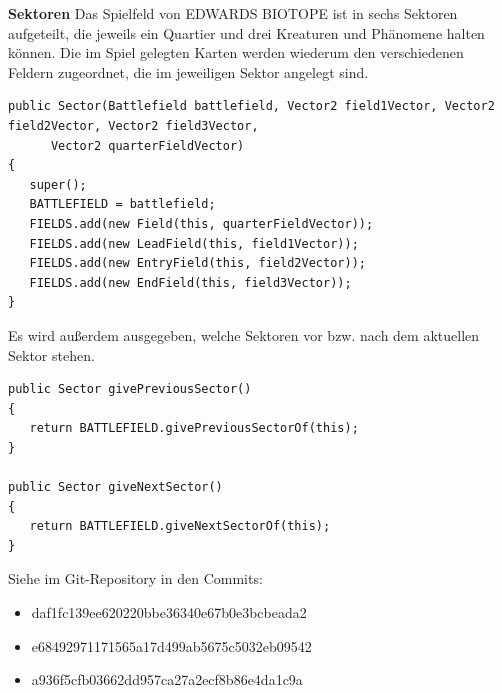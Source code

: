 \textbf{Sektoren}
Das Spielfeld von EDWARDS BIOTOPE ist in sechs Sektoren aufgeteilt, die jeweils ein Quartier und drei Kreaturen und Phänomene halten können. Die im Spiel gelegten Karten werden wiederum den verschiedenen Feldern zugeordnet, die im jeweiligen Sektor angelegt sind.
\begin{lstlisting}[basicstyle=\tiny]
public Sector(Battlefield battlefield, Vector2 field1Vector, Vector2 field2Vector, Vector2 field3Vector,
      Vector2 quarterFieldVector)
{
   super();
   BATTLEFIELD = battlefield;
   FIELDS.add(new Field(this, quarterFieldVector));
   FIELDS.add(new LeadField(this, field1Vector));
   FIELDS.add(new EntryField(this, field2Vector));
   FIELDS.add(new EndField(this, field3Vector));
}
\end{lstlisting}
Es wird außerdem ausgegeben, welche Sektoren vor bzw. nach dem aktuellen Sektor stehen.
\begin{lstlisting}
public Sector givePreviousSector()
{
   return BATTLEFIELD.givePreviousSectorOf(this);
}

public Sector giveNextSector()
{
   return BATTLEFIELD.giveNextSectorOf(this);
}
\end{lstlisting}

Siehe im Git-Repository in den Commits:
\begin{itemize}
\item daf1fc139ee620220bbe36340e67b0e3bcbeada2
\item e68492971171565a17d499ab5675c5032eb09542
\item a936f5cfb03662dd957ca27a2ecf8b86e4da1c9a
\end{itemize}

